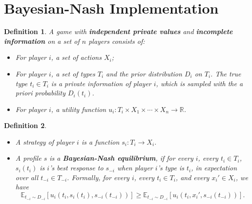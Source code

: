 \documentclass[openany]{book}
\newtheorem{definition}{Definition}[chapter]
\theoremstyle{remark}
\begin{document}
\section{Bayesian-Nash Implementation}
\begin{definition}
    A game with \textbf{independent private values} and \textbf{incomplete information} on a set of $n$ players consists of:
    \begin{itemize}
        \item For player $i$, a set of actions $X_i$;
        \item For player $i$, a set of types $T_i$ and the prior distribution $D_i$ on $T_i$. The true type $t_i\in T_i$ is a private information of player $i$, which is sampled with the a priori probability $D_i(t_i)$.
        \item For player $i$, a utility function $u_i:T_i\times X_1\times\cdots\times X_n\to \mathbb{R}$.
    \end{itemize}
\end{definition}
\begin{definition}$\ $
    \begin{itemize}
        \item A strategy of player $i$ is a function $s_i:T_i\to X_i$.
        \item A profile $s$ is a \textbf{Bayesian-Nash equilibrium}, if for every $i$, every $t_i\in T_i$, $s_i(t_i)$ is $i$'s best response to $s_{-i}$ when player $i$'s type is $t_i$, in expectation over all $t_{-i}\in T_{-i}$. Formally, for every $i$, every $t_i\in T_i$, and every $x_i'\in X_i$, we have
        \begin{equation}
            \mathbb{E}_{t_{-i}\sim D_{-i}}[u_i(t_i,s_i(t_i),s_{-i}(t_{-i}))]\ge \mathbb{E}_{t_{-i}\sim D_{-i}}[u_i(t_i,x_i',s_{-i}(t_{-i}))].
        \end{equation}
    \end{itemize}
\end{definition}
\end{document}
